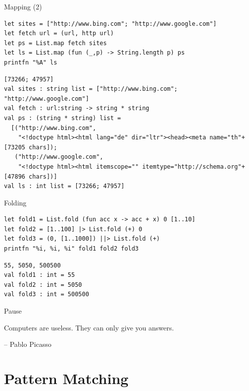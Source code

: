 \documentclass[t]{beamer}
\begin{document}
\begin{frame}[label={sec:orgfb207e6},fragile]{Mapping (2)}
 \tiny

\begin{verbatim}
let sites = ["http://www.bing.com"; "http://www.google.com"]
let fetch url = (url, http url)
let ps = List.map fetch sites
let ls = List.map (fun (_,p) -> String.length p) ps
printfn "%A" ls
\end{verbatim}

\begin{verbatim}
[73266; 47957]
val sites : string list = ["http://www.bing.com"; "http://www.google.com"]
val fetch : url:string -> string * string
val ps : (string * string) list =
  [("http://www.bing.com",
    "<!doctype html><html lang="de" dir="ltr"><head><meta name="th"+[73205 chars]);
   ("http://www.google.com",
    "<!doctype html><html itemscope="" itemtype="http://schema.org"+[47896 chars])]
val ls : int list = [73266; 47957]
\end{verbatim}
\end{frame}

\begin{frame}[label={sec:orgb0d6ce8},fragile]{Folding}
 \begin{verbatim}
let fold1 = List.fold (fun acc x -> acc + x) 0 [1..10]
let fold2 = [1..100] |> List.fold (+) 0
let fold3 = (0, [1..1000]) ||> List.fold (+)
printfn "%i, %i, %i" fold1 fold2 fold3
\end{verbatim}

\begin{verbatim}
55, 5050, 500500
val fold1 : int = 55
val fold2 : int = 5050
val fold3 : int = 500500
\end{verbatim}
\end{frame}

\begin{frame}[label={sec:org6450861}]{Pause}
\begin{block}{}
Computers are useless. They can only give you answers.

\null\hfill-- Pablo Picasso
\end{block}
\end{frame}


\section{Pattern Matching }
\label{sec:orgbbb7500}
\end{document}
